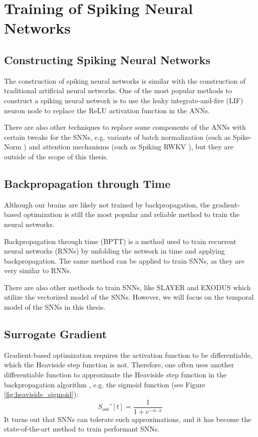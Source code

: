\section{Training of Spiking Neural Networks}
\label{sec:snn_training}

    \subsection{Constructing Spiking Neural Networks}
    \label{subsec:snn_construct}
        The construction of spiking neural networks is similar with the construction of traditional artificial neural networks. One of the most popular methods to construct a spiking neural network is to use the leaky integrate-and-fire (LIF) neuron node to replace the ReLU activation function in the ANNs. 

        There are also other techniques to replace some components of the ANNs with certain tweaks for the SNNs, e.g. variants of batch normalization (such as Spike-Norm \cite{10.3389/fnins.2019.00095}) and attention mechanisms (such as Spiking RWKV \cite{zhu2024spikegptgenerativepretrainedlanguage}), but they are outside of the scope of this thesis. 

    \subsection{Backpropagation through Time}
    \label{subsec:snn_bptt}
        Although our brains are likely not trained by backpropagation, the gradient-based optimization is still the most popular and reliable method to train the neural networks. 

        Backpropagation through time (BPTT) is a method used to train recurrent neural networks (RNNs) \cite{6302929} by unfolding the network in time and applying backpropagation. The same method can be applied to train SNNs, as they are very similar to RNNs. 

        There are also other methods to train SNNs, like SLAYER \cite{Shrestha2018} and EXODUS \cite{bauer2022exodus} which utilize the vectorized model of the SNNs. However, we will focus on the temporal model of the SNNs in this thesis.

    \subsection{Surrogate Gradient}
    \label{subsec:lif_surrogate}
        Gradient-based optimization requires the activation function to be differentiable, which the Heaviside step function is not. Therefore, one often uses another differentiable function to approximate the Heaviside step function in the backpropagation algorithm \cite{8891809}, e.g. the sigmoid function (see Figure \ref{fig:heaviside_sigmoid}): 
        \begin{equation}
            S_{\text{out}}'[t] = \frac{1}{1 + e^{-\alpha \cdot x}}
        \end{equation}
        It turns out that SNNs can tolerate such approximations, and it has become the state-of-the-art method to train performant SNNs.
